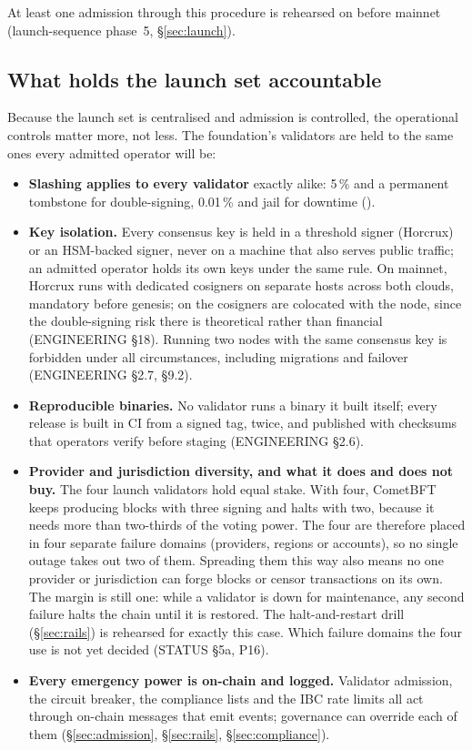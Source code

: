 At least one admission through this procedure is rehearsed on 
before mainnet (launch-sequence phase~5, \S\ref{sec:launch}).

\subsection{What holds the launch set accountable}

Because the launch set is centralised and admission is controlled, the
operational controls matter more, not less. The foundation's validators are
held to the same ones every admitted operator will be:

\begin{itemize}
\item \textbf{Slashing applies to every validator} exactly alike: 5\,\% and a
  permanent tombstone for double-signing, 0.01\,\% and jail for downtime
  ().
\item \textbf{Key isolation.} Every consensus key is held in a threshold
  signer (Horcrux) or an HSM-backed signer, never on a machine that also
  serves public traffic; an admitted operator holds its own keys under the
  same rule. On mainnet, Horcrux runs with dedicated cosigners on separate
  hosts across both clouds, mandatory before genesis; on
   the cosigners are colocated with the node, since the
  double-signing risk there is theoretical rather than financial
  (ENGINEERING \S18). Running two nodes with
  the same consensus key is forbidden under all circumstances, including
  migrations and failover (ENGINEERING \S2.7, \S9.2).
\item \textbf{Reproducible binaries.} No validator runs a binary it built
  itself; every release is built in CI from a signed tag, twice, and published
  with checksums that operators verify before staging (ENGINEERING \S2.6).
\item \textbf{Provider and jurisdiction diversity, and what it does and does
  not buy.} The four launch validators hold equal stake. With four,
  CometBFT keeps producing blocks with three signing and halts with two,
  because it needs more than two-thirds of the voting power. The four are
  therefore placed in four separate failure domains (providers, regions or
  accounts), so no single outage takes out two of them. Spreading them this
  way also means no one provider or jurisdiction can forge blocks or censor
  transactions on its own. The margin is still one: while a validator is down
  for maintenance, any second failure halts the chain until it is restored.
  The halt-and-restart drill (\S\ref{sec:rails}) is rehearsed for exactly
  this case. Which failure domains the four use is not yet decided (STATUS
  \S5a, P16).
\item \textbf{Every emergency power is on-chain and logged.} Validator
  admission, the circuit breaker, the compliance lists and the IBC rate limits
  all act through on-chain messages that emit events; governance can override
  each of them (\S\ref{sec:admission}, \S\ref{sec:rails},
  \S\ref{sec:compliance}).
\end{itemize}

